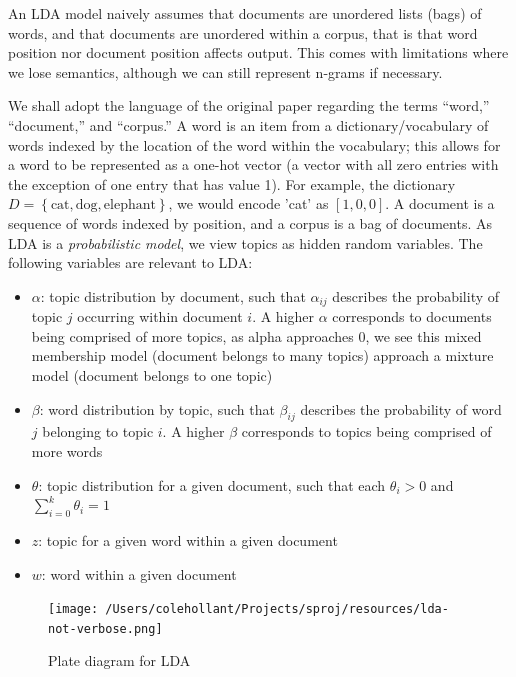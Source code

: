 \documentclass[11pt, twoside, reqno]{book}
\begin{document}
An LDA model naively assumes that documents are unordered lists (bags) of words, and that documents are unordered within a corpus, that is that word position nor document position affects output. This comes with limitations where we lose semantics, although we can still represent n-grams if necessary.

We shall adopt the language of the original paper regarding the terms ``word,'' ``document,'' and ``corpus.'' A word is an item from a dictionary/vocabulary of words indexed by the location of the word within the vocabulary; this allows for a word to be represented as a one-hot vector (a vector with all zero entries with the exception of one entry that has value 1). For example, the dictionary $D = \left\{ \text{cat}, \text{dog}, \text{elephant} \right\}$, we would encode 'cat' as $\left[ 1, 0, 0 \right]$. A document is a sequence of words indexed by position, and a corpus is a bag of documents. As LDA is a \textit{probabilistic model}, we view topics as hidden random variables. The following variables are relevant to LDA:

\begin{itemize}
\item $\alpha$: topic distribution by document, such that $\alpha_{ij}$ describes the probability of topic $j$ occurring within document $i$. A higher $\alpha$ corresponds to documents being comprised of more topics, as alpha approaches 0, we see this mixed membership model (document belongs to many topics) approach a mixture model (document belongs to one topic)

\item $\beta$: word distribution by topic, such that $\beta_{ij}$ describes the probability of word $j$ belonging to topic $i$. A higher $\beta$ corresponds to topics being comprised of more words

\item $\theta$: topic distribution for a given document, such that each $\theta_i > 0$  and $\sum_{i=0}^{k} \theta_i=1$

\item $z$: topic for a given word within a given document

\item $w$: word within a given document
\end{itemize}

\begin{figure}[h!]
  \centering
  \texttt{[image: /Users/colehollant/Projects/sproj/resources/lda-not-verbose.png]}
  
  \caption{Plate diagram for LDA \cite{593pxLat90:online}}
  \label{fig:ldaplate}
\end{figure}
\end{document}

